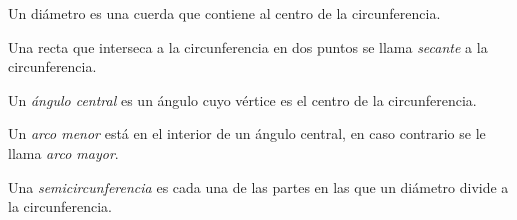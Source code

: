 \begin{definition}
    Un diámetro es una cuerda que contiene al centro de la circunferencia.

    \begin{figure}[!h]
        \centering
        
        \label{fig:diameter}
    \end{figure}
    
\end{definition}

\begin{definition}
    Una recta que interseca a la circunferencia en dos puntos se llama \textit{secante} a la circunferencia.

    \begin{figure}[!h]
        \centering
        
        \label{fig:secant}
    \end{figure}
    
\end{definition}

\clearpage

\begin{definition}
    Un \textit{ángulo central} es un ángulo cuyo vértice es el centro de la circunferencia.

    \begin{figure}[!h]
        \centering
        
        \label{fig:central-angle}
    \end{figure}
    
\end{definition}

\begin{definition}
    Un \textit{arco menor} está en el interior de un ángulo central, en caso contrario se le llama \textit{arco mayor}.

    \begin{figure}[!h]
        \centering
        
        \label{fig:arcs}
    \end{figure}
\end{definition}

\begin{definition}
    Una \textit{semicircunferencia} es cada una de las partes en las que un diámetro divide a la circunferencia.
\end{definition}

